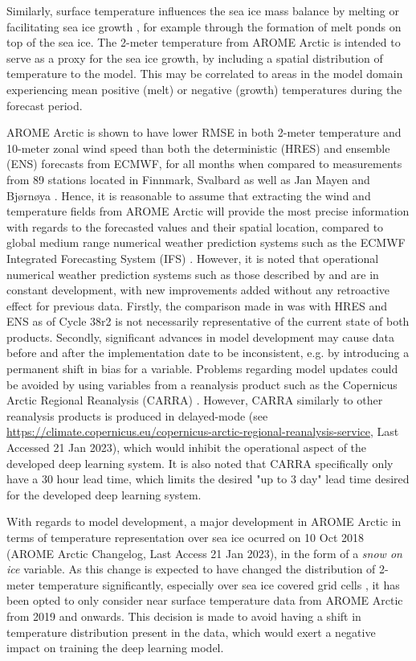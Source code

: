 \documentclass[../main/thesis.tex]{subfiles}
\begin{document}
Similarly, surface temperature influences the sea ice mass balance by melting or facilitating sea ice growth \citep{Hibler1979}, for example through the formation of melt ponds on top of the sea ice. The 2-meter temperature from AROME Arctic is intended to serve as a proxy for the sea ice growth, by including a spatial distribution of temperature to the model. This may be correlated to areas in the model domain experiencing mean positive (melt) or negative (growth) temperatures during the forecast period.

AROME Arctic is shown to have lower RMSE in both 2-meter temperature and 10-meter zonal wind speed than both the deterministic (HRES) and ensemble (ENS) forecasts from ECMWF, for all months when compared to measurements from 89 stations located in Finnmark, Svalbard as well as Jan Mayen and Bjørnøya \citep{Mueller2017}. Hence, it is reasonable to assume that extracting the wind and temperature fields from AROME Arctic will provide the most precise information with regards to the forecasted values and their spatial location, compared to global medium range numerical weather prediction systems such as the ECMWF Integrated Forecasting System (IFS) \citep{Haiden2022}. However, it is noted that operational numerical weather prediction systems such as those described by \citet{Mueller2017} and \citet{Haiden2022} are in constant development, with new improvements added without any retroactive effect for previous data. Firstly, the comparison made in \citet{Mueller2017} was with HRES and ENS as of Cycle 38r2 \cite{Bauer2013} is not necessarily representative of the current state of both products. Secondly, significant advances in model development may cause data before and after the implementation date to be inconsistent, e.g. by introducing a permanent shift in bias for a variable. Problems regarding model updates could be avoided by using variables from a reanalysis product such as the Copernicus Arctic Regional Reanalysis (CARRA) \citep{Koeltzow2022}. However, CARRA similarly to other reanalysis products is produced in delayed-mode (see \url{https://climate.copernicus.eu/copernicus-arctic-regional-reanalysis-service}, Last Accessed 21 Jan 2023), which would inhibit the operational aspect of the developed deep learning system. It is also noted that CARRA specifically only have a 30 hour lead time, which limits the desired "up to 3 day" lead time desired for the developed deep learning system.

With regards to model development, a major development in AROME Arctic in terms of temperature representation over sea ice ocurred on 10 Oct 2018 (AROME Arctic Changelog, Last Access 21 Jan 2023), in the form of a \textit{snow on ice} variable. As this change is expected to have changed the distribution of 2-meter temperature significantly, especially over sea ice covered grid cells \citep{Batrak2019}, it has been opted to only consider near surface temperature data from AROME Arctic from 2019 and onwards. This decision is made to avoid having a shift in temperature distribution present in the data, which would exert a negative impact on training the deep learning model.
\end{document}
